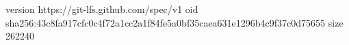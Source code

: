 version https://git-lfs.github.com/spec/v1
oid sha256:43c8fa917cfc0c4f72a1cc2a1f84fe5a0bf35caea631e1296b4c9f37c0d75655
size 262240
